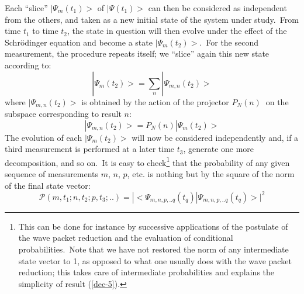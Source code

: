 \documentclass[12pt,onecolumn]{article}%
\begin{document}
Each ``slice'' $|\Psi_{m}(t_{1})>$ of $|\Psi(t_{1})>$ can then be
considered as independent from the others, and taken as a new initial state of
the system under study.\ From time $t_{1}$ to time $t_{2}$, the state in
question will then evolve under the effect of the Schr\"{o}dinger equation and
become a state $|\Psi_{m}(t_{2})>$.\ For the second measurement, the
procedure repeats itself; we ``slice'' again this new state according to:%
\begin{equation}
|\Psi_{m}(t_{2})>=\sum_{n}|\Psi_{m,n}(t_{2})> \label{dec-3}%
\end{equation}
where $|\Psi_{m,n}(t_{2})>$ is obtained by the action of the projector
$P_{N}(n)$ $\ $on the subspace corresponding to result $n$:%
\begin{equation}
|\Psi_{m,n}(t_{2})>=P_{N}(n)|\Psi_{m}(t_{2})> \label{dec-4}%
\end{equation}
The evolution of each $|\Psi_{m}(t_{2})>$ will now be considered
independently and, if a third measurement is performed at a later time $t_{3}%
$, generate one more decomposition, and so on.\ It is easy to
check\footnote{This can be done for instance by successive applications of the
postulate of the wave packet reduction and the evaluation of conditional
probabilities.\ Note that we have not restored the norm of any intermediate
state vector to 1, as opposed to what one usually does with the wave packet
reduction; this takes care of intermediate probabilities and explains the
simplicity of result (\ref{dec-5}).} that the probability of any given
sequence of measurements $m$, $n$, $p$, etc. is nothing but by the square of
the norm of the final state vector:%
\begin{equation}
\mathcal{P}(m,t_{1};n,t_{2};p,t_{3};..)=|<\Psi_{m,n,p,..q}(t_{q})|
\Psi_{m,n,p,..q}(t_{q})>|^{2} \label{dec-5}%
\end{equation}
\end{document}
